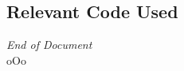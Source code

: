 \newpage 

\subsection{Relevant Code Used} \label{code}

\begin{center}
\toprule
    \textit{End of Document}\\ 
    oOo
\end{center}